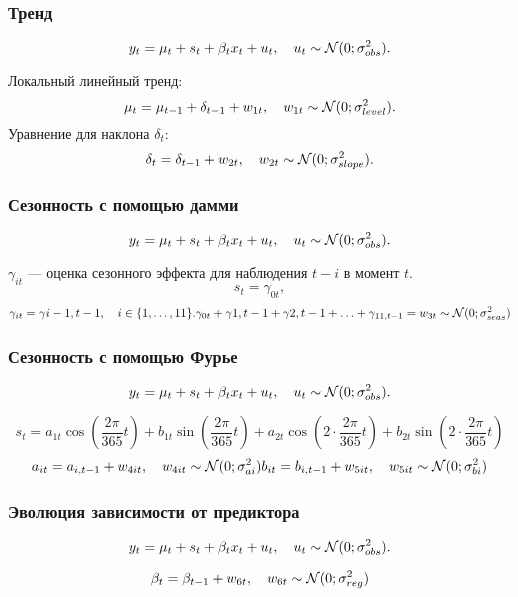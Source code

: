 \begin{frame}
  \frametitle{Тренд}
  \[
  y_t = \mu_t + s_t + \beta_t x_t +  u_t, \quad u_t \sim \mathcal{N}(0; \sigma^2_{obs}).  
  \]

  \pause
  \alert{Локальный линейный тренд}:
  \[
     \mu_t = \mu_{t-1} + \delta_{t-1} + w_{1t}, \quad w_{1t} \sim \mathcal{N}(0; \sigma^2_{level}).
  \]
  \pause
  Уравнение для наклона $\delta_t$:
  \[
    \delta_{t} = \delta_{t-1} +  w_{2t}, \quad w_{2t} \sim \mathcal{N}(0; \sigma^2_{slope}).
  \]
  
\end{frame}

\begin{frame}
  \frametitle{Сезонность с помощью дамми}
  \[
  y_t = \mu_t + s_t + \beta_t x_t +  u_t, \quad u_t \sim \mathcal{N}(0; \sigma^2_{obs}).  
  \]

  \pause
  $\gamma_{it}$ — оценка сезонного эффекта для наблюдения $t-i$ в момент $t$. 
  \[
  s_t = \gamma_{0t},  
  \]
  \pause
  \begin{eqnarray*}
    \gamma_{it} = \gamma{i-1,t-1}, \quad i \in \{1, \ldots, 11\}.  
    \gamma_{0t} + \gamma{1,t-1} + \gamma{2,t-1} + \ldots + \gamma_{11,t-1} = w_{3t} \sim \mathcal{N}(0;\sigma^2_{seas})
  \end{eqnarray*}
\end{frame}


\begin{frame}
  \frametitle{Сезонность с помощью Фурье}
  \[
  y_t = \mu_t + s_t + \beta_t x_t +  u_t, \quad u_t \sim \mathcal{N}(0; \sigma^2_{obs}).  
  \]

  \pause
  \[
     s_t = a_{1t} \cos(\frac{2\pi}{365} t) + b_{1t} \sin(\frac{2\pi}{365} t) + a_{2t} \cos(2\cdot \frac{2\pi}{365} t) + b_{2t} \sin(2\cdot\frac{2\pi}{365} t)
  \]
  \pause
  \begin{eqnarray*}
    a_{it} = a_{i,t-1} + w_{4it}, \quad w_{4it} \sim \mathcal{N}(0;\sigma^2_{ai})
    b_{it} = b_{i,t-1} + w_{5it}, \quad w_{5it} \sim \mathcal{N}(0;\sigma^2_{bi})
  \end{eqnarray*}
  
\end{frame}

\begin{frame}
  \frametitle{Эволюция зависимости от предиктора}
  \[
  y_t = \mu_t + s_t + \beta_t x_t +  u_t, \quad u_t \sim \mathcal{N}(0; \sigma^2_{obs}).  
  \]

  \pause
  \[
     \beta_{t} = \beta_{t-1} + w_{6t}, \quad  w_{6t} \sim \mathcal{N}(0;\sigma^2_{reg})
  \]
  
\end{frame}




